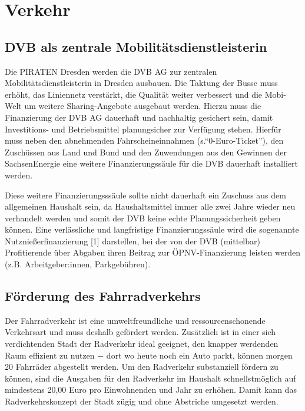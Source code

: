 \documentclass[a4paper, 11pt]{article}
\begin{document}
\section{Verkehr}

\subsection{DVB als zentrale Mobilitätsdienstleisterin}
Die PIRATEN Dresden werden die DVB AG zur zentralen Mobilitätsdienstleisterin in Dresden ausbauen. Die Taktung der Busse muss erhöht, das Liniennetz verstärkt, die Qualität weiter verbessert und die Mobi-Welt um weitere Sharing-Angebote ausgebaut werden. Hierzu muss die Finanzierung der DVB AG dauerhaft und nachhaltig gesichert sein, damit Investitions- und Betriebsmittel planungsicher zur Verfügung stehen. Hierfür muss neben den abnehmenden Fahrscheineinnahmen (s.``0-Euro-Ticket''), den Zuschüssen aus Land und Bund und den Zuwendungen aus den Gewinnen der SachsenEnergie eine weitere Finanzierungssäule für die DVB dauerhaft installiert werden.\newline

Diese weitere Finanzierungsssäule sollte nicht dauerhaft ein Zuschuss aus dem allgemeinen Haushalt sein, da Haushaltsmittel immer alle zwei Jahre wieder neu verhandelt werden und somit der DVB keine echte Planungssicherheit geben können. Eine verlässliche und langfristige Finanzierungssäule wird die sogenannte Nutznießerfinanzierung [1] darstellen, bei der von der DVB (mittelbar) Profitierende über Abgaben ihren Beitrag zur ÖPNV-Finanzierung leisten werden (z.B. Arbeitgeber:innen, Parkgebühren).



\subsection{Förderung des Fahrradverkehrs}
Der Fahrradverkehr ist eine umweltfreundliche und ressourcenschonende Verkehrsart und muss deshalb gefördert werden. Zusätzlich ist in einer sich verdichtenden Stadt der Radverkehr ideal geeignet, den knapper werdenden Raum effizient zu nutzen $-$ dort wo heute noch ein Auto parkt, können morgen 20 Fahrräder abgestellt werden. Um den Radverkehr substanziell fördern zu können, sind die Ausgaben für den Radverkehr im Haushalt schnellstmöglich auf mindestens 20,00 Euro pro Einwohnenden und Jahr zu erhöhen. Damit kann das Radverkehrskonzept der Stadt zügig und ohne Abstriche umgesetzt werden.\newline
\end{document}
